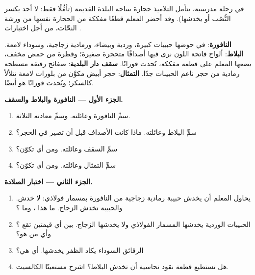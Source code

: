 \begin{problem}
\label{pb:g6:rocks-and-minerals:1}
في رحلة مدرسية، يتأمل التلاميذ حجارة ساحة البلدة القديمة (تأمُّلًا فقط:
لا أحد يكسر النُّصُب أو يخدشها). وقد أحضر المعلم قطعًا مفككة من الحجارة
نفسها من ورشة النحّات، من أجل اختبارات
.

\smallskip
\noindent\textbf{النافورة}: في حوضها حبيبات كبيرة، وردية وبيضاء،
        ورمادية زجاجية، وسوداء لامعة.
\textbf{البلاط}: ألواح فاتحة اللون نرى فيها أصدافًا متحجرة صغيرة؛
        وقطرة من حمض مخفف، يضعها المعلم على قطعة مفككة،
        تُحدث فورانًا.
\textbf{سقف دار البلدية}: صفائح رقيقة مسطحة رمادية من حجر
        ناعم الحبيبات جدًا.
\textbf{التمثال}: حجر أبيض مكوَّن من بلورات لامعة
        تتلألأ كالسكر؛ ويُحدث فورانًا هو أيضًا.

\medskip
\noindent\textbf{الجزء الأول --- النافورة والبلاط والسقف.}
\begin{enumerate}
  \item سمِّ  النافورة وعائلته. وسمِّ معادنه
        الثلاثة.
  \item سمِّ  البلاط وعائلته. ماذا كانت الأصداف قبل أن تصير
        في الحجر؟
  \item سمِّ  السقف وعائلته. ومن أي 
        تكوّن؟
  \item سمِّ  التمثال وعائلته. ومن أي 
        تكوّن؟
\end{enumerate}

\medskip
\noindent\textbf{الجزء الثاني --- اختبار الصلادة.}
\begin{enumerate}[resume]
  \item يحاول المعلم أن يخدش حبيبة رمادية زجاجية من النافورة
        بمسمار فولاذي: لا خدش. والحبيبة تخدش الزجاج. ما
        هذا ، وما ؟
  \item الحبيبات الوردية يخدشها المسمار الفولاذي ولا يخدشها الزجاج.
        بين أي قيمتين تقع ؟ وأي  من 
         هو؟
  \item الرقائق السوداء يكاد الظفر يخدشها. أي
         هي؟
  \item هل تستطيع قطعة نقود نحاسية أن تخدش البلاط؟ اشرح مستعينًا 
        الكالسيت.
\end{enumerate}


\end{problem}
